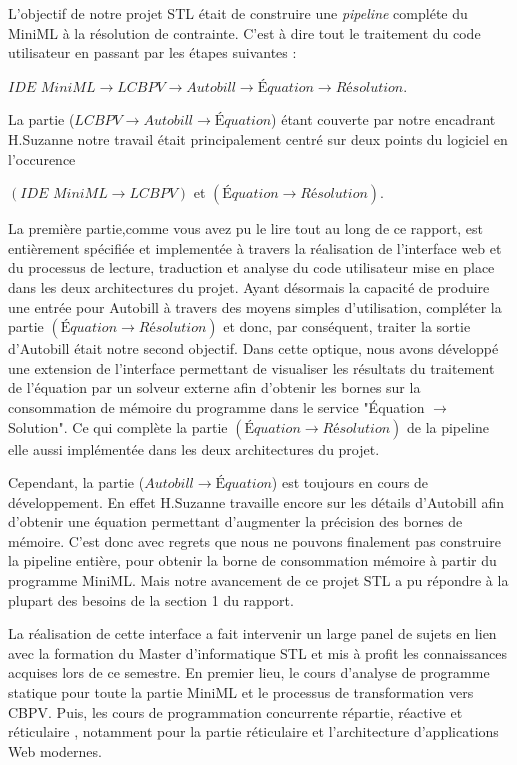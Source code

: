 \documentclass[12pt]{article}
\begin{document}
L'objectif de notre projet STL était de construire une \textit{pipeline} compléte du MiniML à la résolution de contrainte.
C'est à dire tout le traitement du code utilisateur en passant par les étapes suivantes :
\begin{center}
      \quad\quad$ \textit{IDE MiniML} \rightarrow \textit{LCBPV} \rightarrow Autobill \rightarrow Équation \rightarrow Résolution$.
\end{center}
La partie ($\textit{LCBPV} \rightarrow Autobill \rightarrow Équation$) étant couverte par notre encadrant H.Suzanne notre travail était principalement centré sur deux points du logiciel en l'occurence
\begin{center}
      $(\textit{IDE MiniML} \rightarrow \textit{LCBPV})$ et $(Équation \rightarrow Résolution)$.
\end{center}
La première partie,comme vous avez pu le lire tout au long de ce rapport, est entièrement spécifiée et implementée à travers la réalisation de l'interface web et du processus de lecture, traduction et analyse du code utilisateur mise en place dans les deux architectures du projet.
Ayant désormais la capacité de produire une entrée pour Autobill à travers des moyens simples d'utilisation, compléter la partie $(Équation \rightarrow Résolution)$ et donc, par conséquent, traiter la sortie d'Autobill était notre second objectif.
Dans cette optique, nous avons développé une extension de l'interface permettant de visualiser les résultats du traitement de l'équation par un solveur externe afin d'obtenir les bornes sur la consommation de mémoire du programme dans le service "Équation $\rightarrow$ Solution".
Ce qui complète la partie $(Équation \rightarrow Résolution)$ de la pipeline elle aussi implémentée dans les deux architectures du projet.


Cependant, la partie ($Autobill \rightarrow Équation$) est toujours en cours de développement.
En effet H.Suzanne travaille encore sur les détails d'Autobill afin d'obtenir une équation permettant d'augmenter la précision des bornes de mémoire.
C'est donc avec regrets que nous ne pouvons finalement pas construire la pipeline entière, pour obtenir la borne de consommation mémoire à partir du programme MiniML.
Mais notre avancement de ce projet STL a pu répondre à la plupart des besoins de la section 1 du rapport.

La réalisation de cette interface a fait intervenir un large panel de
sujets en lien avec la formation du Master d'informatique STL et mis à
profit les connaissances acquises lors de ce semestre. En premier lieu,
le cours d'analyse de programme statique
\cite{APS} pour toute la partie MiniML et le
processus de transformation vers CBPV. Puis, les cours de programmation
concurrente répartie, réactive et réticulaire
\cite{PC3R}, notamment pour la partie
réticulaire et l'architecture d'applications Web modernes.\\
\end{document}
